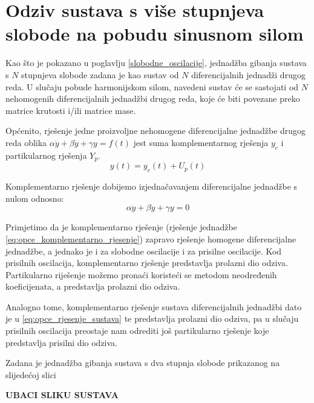 \section{Odziv sustava s više stupnjeva slobode na pobudu sinusnom
silom}\label{mdof_prisilne}
Kao što je pokazano u poglavlju \ref{slobodne_oscilacije}, jednadžba gibanja sustava
s $N$ stupnjeva slobode zadana je kao sustav od $N$ diferencijalnih jednadži drugog
reda. U slučaju pobude harmonijskom silom, navedeni sustav će se sastojati od $N$
nehomogenih diferencijalnih jednadžbi drugog reda, koje će biti povezane preko
matrice krutosti i/ili matrice mase. 
\par
Općenito, rješenje jedne proizvoljne nehomogene diferencijalne jednadžbe drugog reda
oblika $\alpha\ddot{y}+\beta\dot{y}+\gamma y= f(t)$ jest suma komplementarnog
rješenja $y_c$ i partikularnog rješenja $Y_p$.
\begin{equation}
    y(t)=y_c(t)+U_p(t)
\end{equation}

Komplementarno rješenje dobijemo izjednačavanjem diferencijalne jednadžbe s nulom
odnosno:
\begin{equation}\label{eq:opce_komplementarno_rjesenje}
    \alpha\ddot{y}+\beta\dot{y}+\gamma y=0
\end{equation}

Primjetimo da je komplementarno rješenje (rješenje jednadžbe \eqref{eq:opce_komplementarno_rjesenje}) 
zapravo rješenje homogene diferencijalne jednadžbe, a jednako je i za slobodne 
oscilacije i za prisilne oscilacije. Kod prisilnih oscilacija, komplementarno 
rješenje predstavlja prolazni dio odziva. Partikularno riješenje možemo pronaći 
koristeći se metodom neodređenih koeficijenata, a predstavlja prolazni dio odziva.
\par

Analogno tome, komplementarno rješenje sustava diferencijalnih jednadžbi dato je u
\eqref{eq:opce_rjesenje_sustava} te predstavlja prolazni dio odziva, pa u slučaju
prisilnih oscilacija preostaje nam odrediti još partikularno rješenje koje
predstavlja prisilni dio odziva. 
\par

Zadana je jednadžba gibanja sustava s dva stupnja slobode prikazanog na slijedećoj
slici

\textbf{UBACI SLIKU SUSTAVA}

